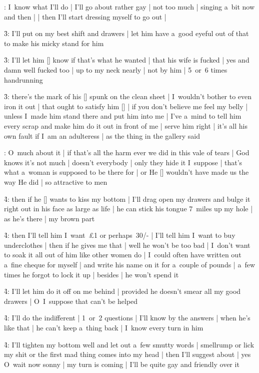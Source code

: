 :
I~know what I'll do |
I'll go about rather gay |
not too much |
singing a~bit now and then |
 |
then I'll start dressing myself to go out |

\f3:
I'll put on my best shift and drawers |
let him have a~good eyeful out of that to make his micky stand for him

\f3:
I'll let him [\bloom] know if that's what he wanted |
that his wife is fucked |
yes and damn well fucked too |
up to my neck nearly |
not by him |
5~or~6 times handrunning

\f3:
there's the mark of his [\boylan] spunk on the clean sheet |
I~wouldn't bother to even iron it out |
that ought to satisfy him [\bloom] |
if you don't believe me feel my belly |
unless I~made him stand there and put him into me |
I've a~mind to tell him every scrap and make him do it out in front of me |
serve him right |
it's all his own fault if I~am an adulteress |
as the thing in the gallery said

:
O~much about it |
if that's all the harm ever we did in this vale of tears |
God knows it's not much |
doesn't everybody |
only they hide it I~suppose |
that's what a~woman is supposed to be there for |
or He [\ourlord] wouldn't have made us the way He did |
so attractive to men

\f4:
then if he [\bloom] wants to kiss my bottom |
I'll drag open my drawers and bulge it right out in his face as large as life |
he can stick his tongue 7~miles up my hole |
as he's there |
my brown part

\f4:
then I'll tell him I~want~£1 or perhaps~30/- |
I'll tell him I~want to buy underclothes |
then if he gives me that |
well he won't be too bad |
I~don't want to soak it all out of him
like other women do |
I~could often have written out a~fine cheque for myself |
and write his name on it for a~couple of pounds |
a~few times he forgot to lock it up |
besides |
he won't spend it

\f4:
I'll let him do it off on me behind |
provided he doesn't smear all my good drawers |
O~I~suppose that can't be helped

\f4:
I'll do the indifferent |
1~or~2 questions |
I'll know by the answers |
when he's like that |
he can't keep a~thing back |
I~know every turn in him

\f4:
I'll tighten my bottom well and let out a~few smutty words |
smellrump or lick my shit or the first mad thing comes into my head |
then I'll suggest about |
yes O~wait now sonny |
my turn is coming |
I'll be quite gay and friendly over it

